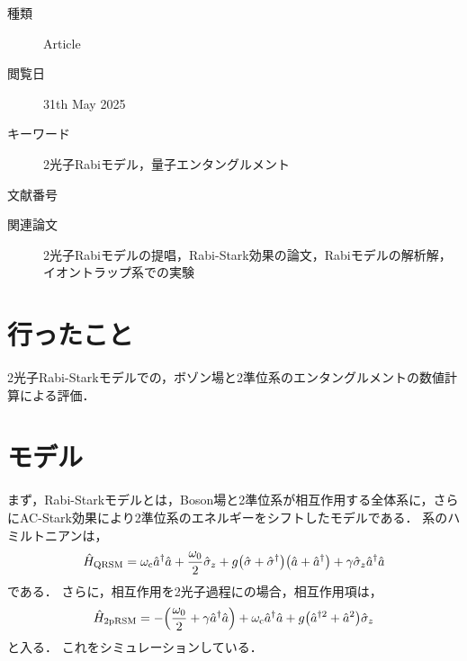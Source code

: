 \documentclass{report}
\begin{document}
    \begin{boxnote}
      \begin{description}
        \item[種類] Article
        \item[閲覧日] 31th May 2025
        \item[キーワード] 2光子Rabiモデル，量子エンタングルメント
        \item[文献番号] \cite{boutakkaQuantumEntanglementTwophoton2025}
        \item[関連論文] 2光子Rabiモデルの提唱\cite{hammaniTwophotonQuantumRabi2023}，Rabi-Stark効果の論文\cite{grimsmoCavityQEDSimulationQubitoscillator2013a}，Rabiモデルの解析解\cite{braakIntegrabilityRabiModel2011a}，イオントラップ系での実験\cite{congSelectiveInteractionsQuantum2020}
      \end{description}
    \end{boxnote}
    \section{行ったこと}
      2光子Rabi-Starkモデルでの，ボゾン場と2準位系のエンタングルメントの数値計算による評価．
    \section{モデル}
      まず，Rabi-Starkモデルとは，Boson場と2準位系が相互作用する全体系に，さらにAC-Stark効果により2準位系のエネルギーをシフトしたモデルである．
      系のハミルトニアンは，
      \begin{align}
        \hat{H}_{\mathrm{QRSM}} = \omega_{\mathrm{c}}\hat{a}^{\dag}\hat{a} + \frac{\omega_0}{2}\hat{\sigma}_z + g\qty(\hat{\sigma} + \hat{\sigma}^{\dag})\qty(\hat{a} + \hat{a}^{\dag}) + \gamma\hat{\sigma}_z\hat{a}^{\dag}\hat{a}
      \end{align}
      である．
      さらに，相互作用を2光子過程にの場合，相互作用項は，
      \begin{align}
        \hat{H}_{\mathrm{2pRSM}} = -\qty(\frac{\omega_0}{2} + \gamma\hat{a}^{\dag}\hat{a}) + \omega_{\mathrm{c}}\hat{a}^{\dag}\hat{a} + g\qty(\hat{a}^{\dag 2} + \hat{a}^2)\hat{\sigma}_z
      \end{align}
      と入る．
      これをシミュレーションしている．
\end{document}
